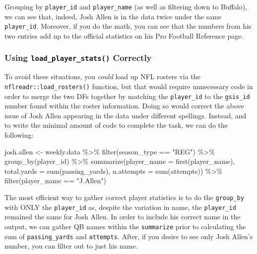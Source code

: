 \documentclass[
  letterpaper,
]{krantz}
\newenvironment{Shaded}{\begin{snugshade}}{\end{snugshade}}
\newcommand{\AttributeTok}[1]{\textcolor[rgb]{0.40,0.45,0.13}{#1}}
\newcommand{\FunctionTok}[1]{\textcolor[rgb]{0.28,0.35,0.67}{#1}}
\newcommand{\NormalTok}[1]{\textcolor[rgb]{0.00,0.23,0.31}{#1}}
\newcommand{\OtherTok}[1]{\textcolor[rgb]{0.00,0.23,0.31}{#1}}
\newcommand{\SpecialCharTok}[1]{\textcolor[rgb]{0.37,0.37,0.37}{#1}}
\newcommand{\StringTok}[1]{\textcolor[rgb]{0.13,0.47,0.30}{#1}}
\begin{document}
Grouping by \texttt{player\_id} and \texttt{player\_name} (as well as
filtering down to Buffalo), we can see that, indeed, Josh Allen is in
the data twice under the same \texttt{player\_id}. Moreover, if you do
the math, you can see that the numbers from his two entries add up to
the official statistics on his Pro Football Reference page.

\hypertarget{using-load_player_stats-correctly}{%
\subsubsection{\texorpdfstring{Using \texttt{load\_player\_stats()}
Correctly}{Using load\_player\_stats() Correctly}}\label{using-load_player_stats-correctly}}

To avoid these situations, you \emph{could} load up NFL rosters via the
\texttt{nflreadr::load\_rosters()} function, but that would require
unnecessary code in order to merge the two DFs together by matching the
\texttt{player\_id} to the \texttt{gsis\_id} number found within the
roster information. Doing so would correct the above issue of Josh Allen
appearing in the data under different spellings. Instead, and to write
the minimal amount of code to complete the task, we can do the
following:

\begin{Shaded}
\begin{Highlighting}[]
\NormalTok{josh.allen }\OtherTok{\textless{}{-}}\NormalTok{ weekly.data }\SpecialCharTok{\%\textgreater{}\%}
  \FunctionTok{filter}\NormalTok{(season\_type }\SpecialCharTok{==} \StringTok{"REG"}\NormalTok{) }\SpecialCharTok{\%\textgreater{}\%}
  \FunctionTok{group\_by}\NormalTok{(player\_id) }\SpecialCharTok{\%\textgreater{}\%}
  \FunctionTok{summarize}\NormalTok{(}\AttributeTok{player\_name =} \FunctionTok{first}\NormalTok{(player\_name),}
            \AttributeTok{total.yards =} \FunctionTok{sum}\NormalTok{(passing\_yards),}
            \AttributeTok{n.attempts =} \FunctionTok{sum}\NormalTok{(attempts)) }\SpecialCharTok{\%\textgreater{}\%}
  \FunctionTok{filter}\NormalTok{(player\_name }\SpecialCharTok{==} \StringTok{"J.Allen"}\NormalTok{)}
\end{Highlighting}
\end{Shaded}

The most efficient way to gather correct player statistics is to do the
\texttt{group\_by} with ONLY the \texttt{player\_id} as, despite the
variation in name, the \texttt{player\_id} remained the same for Josh
Allen. In order to include his correct name in the output, we can gather
QB names within the \texttt{summarize} prior to calculating the sum of
\texttt{passing\_yards} and \texttt{attempts}. After, if you desire to
see only Josh Allen's number, you can filter out to just his name.
\end{document}
